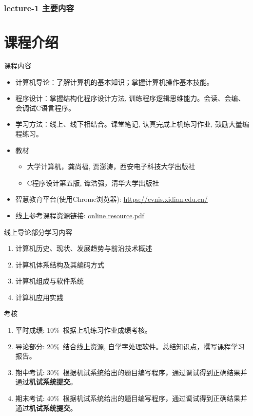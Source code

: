 \begin{frame}
  \frametitle{lecture-1 主要内容}
  \tableofcontents[hideallsubsections]
\end{frame}

\section{课程介绍}

\begin{frame}[shrink]{课程内容}
\begin{itemize}
	\item 计算机导论：了解计算机的基本知识；掌握计算机操作基本技能。
	\item 程序设计：掌握结构化程序设计方法, 训练程序逻辑思维能力。会读、会编、会调试C语言程序。
	\item 学习方法：线上、线下相结合。课堂笔记, 认真完成上机练习作业, 鼓励大量编程练习。
	\item 教材
	\begin{itemize}
		\item 大学计算机，龚尚福, 贾澎涛，西安电子科技大学出版社
		\item C程序设计第五版, 谭浩强，清华大学出版社
	\end{itemize}
	\item 智慧教育平台(使用Chrome浏览器): 
	\href{https://cvnis.xidian.edu.cn/}{ https://cvnis.xidian.edu.cn/}
	\item 线上参考课程资源链接:
	\href{./online resource.pdf}{online resource.pdf} %
\end{itemize}
\end{frame}

\begin{frame}{线上导论部分学习内容}
\begin{enumerate}
	\setlength{\itemsep}{.8cm}
	\item 计算机历史、现状、发展趋势与前沿技术概述
	\item 计算机体系结构及其编码方式
	\item 计算机组成与软件系统
	\item 计算机应用实践
\end{enumerate}
\end{frame}

\begin{frame}{考核}
\begin{enumerate}
	\setlength{\itemsep}{.5cm}
	\item 平时成绩: 10\%~根据上机练习作业成绩考核。
	\item 导论部分: 20\%~结合线上资源, 自学字处理软件。总结知识点，撰写课程学习报告。
	\item 期中考试: 30\%~根据机试系统给出的题目编写程序，通过调试得到正确结果并通过\textbf{机试系统提交}。
	\item 期末考试: 40\%~根据机试系统给出的题目编写程序，通过调试得到正确结果并通过\textbf{机试系统提交}。
\end{enumerate}
\end{frame}

